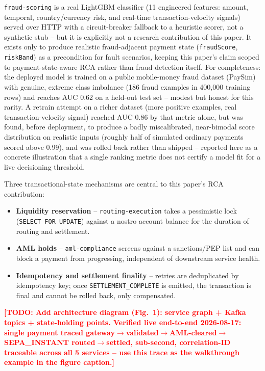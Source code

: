 \documentclass[conference]{IEEEtran}
\newcommand{\todo}[1]{\textcolor{red}{\textbf{[TODO: #1]}}}
\begin{document}
\texttt{fraud-scoring} is a real LightGBM classifier (11 engineered
features: amount, temporal, country/currency risk, and real-time
transaction-velocity signals) served over HTTP with a circuit-breaker
fallback to a heuristic scorer, not a synthetic stub -- but it is
explicitly not a research contribution of this paper. It exists only to
produce realistic fraud-adjacent payment state (\texttt{fraudScore},
\texttt{riskBand}) as a precondition for fault scenarios, keeping this
paper's claim scoped to payment-state-aware RCA rather than fraud
detection itself. For completeness: the deployed model is trained on a
public mobile-money fraud dataset (PaySim) with genuine, extreme class
imbalance (186 fraud examples in 400,000 training rows) and reaches AUC
0.62 on a held-out test set -- modest but honest for this rarity. A
retrain attempt on a richer dataset (more positive examples, real
transaction-velocity signal) reached AUC 0.86 by that metric alone, but
was found, before deployment, to produce a badly miscalibrated,
near-bimodal score distribution on realistic inputs (roughly half of
simulated ordinary payments scored above 0.99), and was rolled back
rather than shipped -- reported here as a concrete illustration that a
single ranking metric does not certify a model fit for a live
decisioning threshold.

Three transactional-state mechanisms are central to this paper's RCA
contribution:
\begin{itemize}
  \item \textbf{Liquidity reservation} -- \texttt{routing-execution} takes a
  pessimistic lock (\texttt{SELECT FOR UPDATE}) against a nostro account
  balance for the duration of routing and settlement.
  \item \textbf{AML holds} -- \texttt{aml-compliance} screens against a
  sanctions/PEP list and can block a payment from progressing, independent
  of downstream service health.
  \item \textbf{Idempotency and settlement finality} -- retries are
  deduplicated by idempotency key; once \texttt{SETTLEMENT\_COMPLETE} is
  emitted, the transaction is final and cannot be rolled back, only
  compensated.
\end{itemize}

\todo{Add architecture diagram (Fig.~1): service graph + Kafka topics +
state-holding points. Verified live end-to-end 2026-08-17: single payment
traced gateway$\to$validated$\to$AML-cleared$\to$SEPA\_INSTANT
routed$\to$settled, sub-second, correlation-ID traceable across all 5
services -- use this trace as the walkthrough example in the figure
caption.}
\end{document}
